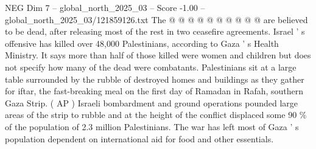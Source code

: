 \begin{textsample}{NEG Dim 7 – global\_north\_2025\_03 – Score -1.00 – global\_north\_2025\_03/121859126.txt}
The @ @ @ @ @ @ @ @ @ @ are believed to be dead, after releasing most of the rest in two ceasefire agreements.
Israel ' s offensive has killed over 48,000 Palestinians, according to Gaza ' s Health Ministry.
It says more than half of those killed were women and children but does not specify how many of the dead were combatants.
Palestinians sit at a large table surrounded by the rubble of destroyed homes and buildings as they gather for iftar, the fast-breaking meal on the first day of Ramadan in Rafah, southern Gaza Strip. ( AP ) Israeli bombardment and ground operations pounded large areas of the strip to rubble and at the height of the conflict displaced some 90 \% of the population of 2.3 million Palestinians.
The war has left most of Gaza ' s population dependent on international aid for food and other essentials.

\end{textsample}
